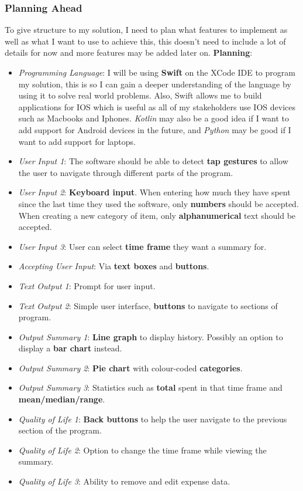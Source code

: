 \documentclass{article}
\begin{document}
\subsubsection{Planning Ahead}
To give structure to my solution, I need to plan what features to implement as well as what I want to use to achieve this, this doesn't need to include a lot of details for now and more features may be added later on. \newline \newline
\textbf{Planning}:
\begin{itemize}
    \item \textit{Programming Language}: I will be using \textbf{Swift} on the XCode IDE to program my solution, this is so I can gain a deeper understanding of the language by using it to solve real world problems. Also, Swift allows me to build applications for IOS which is useful as all of my stakeholders use IOS devices such as Macbooks and Iphones. \textit{Kotlin} may also be a good idea if I want to add support for Android devices in the future, and \textit{Python} may be good if I want to add support for laptops.
    \item \textit{User Input 1}: The software should be able to detect \textbf{tap gestures} to allow the user to navigate through different parts of the program.
    \item \textit{User Input 2}: \textbf{Keyboard input}. When entering how much they have spent since the last time they used the software, only \textbf{numbers} should be accepted. When creating a new category of item, only \textbf{alphanumerical} text should be accepted.
    \item \textit{User Input 3}: User can select \textbf{time frame} they want a summary for.
    \item \textit{Accepting User Input}: Via \textbf{text boxes} and \textbf{buttons}.
    \item \textit{Text Output 1}: Prompt for user input.
    \item \textit{Text Output 2}: Simple user interface, \textbf{buttons} to navigate to sections of program.
    \item \textit{Output Summary 1}: \textbf{Line graph} to display history. Possibly an option to display a \textbf{bar chart} instead.
    \item \textit{Output Summary 2}: \textbf{Pie chart} with colour-coded \textbf{categories}.
    \item \textit{Output Summary 3}: Statistics such as \textbf{total} spent in that time frame and \textbf{mean/median/range}.
    \item \textit{Quality of Life 1}: \textbf{Back buttons} to help the user navigate to the previous section of the program.
    \item \textit{Quality of Life 2}: Option to change the time frame while viewing the summary.
    \item \textit{Quality of Life 3}: Ability to remove and edit expense data.
\end{itemize}
\end{document}
